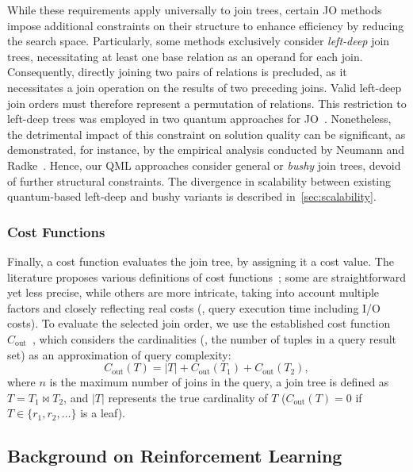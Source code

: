 \documentclass[10pt, conference]{IEEEtran}
\renewcommand{\Join}{\bowtie}
\begin{document}
While these requirements apply universally to join trees, certain JO methods impose additional constraints on their structure to enhance efficiency by reducing the search space.
Particularly, some methods exclusively consider \emph{left-deep} join trees, necessitating at least one base relation as an operand for each join.
Consequently, directly joining two pairs of relations is precluded, as it necessitates a join operation on the results of two preceding joins.
Valid left-deep join orders must therefore represent a permutation of relations.
This restriction to left-deep trees was employed in two quantum approaches for JO~\cite{schoenberger23, schoenberger24}.
Nonetheless, the detrimental impact of this constraint on solution quality can be significant, as demonstrated, for instance, by the empirical analysis conducted by Neumann and Radke~\cite{neumann18}.
Hence, our QML approaches consider general or \emph{bushy} join trees, devoid of further structural constraints.
The divergence in scalability between existing quantum-based left-deep and bushy variants is described in~\autoref{sec:scalability}.

\subsubsection{Cost Functions}
Finally, a cost function evaluates the join tree, by assigning it a cost value.
The literature proposes various definitions of cost functions~\cite{kurella18}; some are straightforward yet less precise, while others are more intricate, taking into account multiple factors and closely reflecting real costs (\ie, query execution time including I/O costs).
To evaluate the selected join order, we use the established cost function $C_{\text{out}}$~\cite{cluet95}, which considers the cardinalities (\ie, the number of tuples in a query result set) as an approximation of query complexity:
%
\begin{equation}
  C_{\text{out}}(T) =
    |T| + C_{\text{out}}(T_1) + C_{\text{out}}(T_2),
\end{equation}
%
where $n$ is the maximum number of joins in the query, a join tree is defined as $T = T_1 \Join T_2$, and $|T|$ represents the true cardinality of $T$ ($C_{\text{out}}(T) = 0$ if $T \in \{r_1, r_2, \dots\}$ is a leaf).

\subsection{Background on Reinforcement Learning}
\label{sec:bg-rl}
\end{document}
